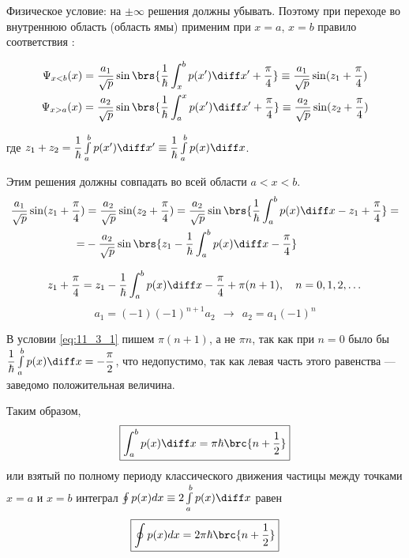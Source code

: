 Физическое условие: на $\pm \infty$ решения должны убывать. Поэтому при переходе во внутреннюю область (область ямы) применим при $x=a$, $x=b$ правило соответствия :

$$
\begin{gathered}
\Psi_{x<b}(x) = \frac{a_1}{\sqrt{p}} \sin\brs{\frac{1}{\hbar} \int_{x}^{b} p(x') \diff x' + \frac{\pi}{4} } \equiv \frac{a_1}{\sqrt{p}} \sin({z_1 + \frac{\pi}{4}}) \\
\Psi_{x>a}(x) = \frac{a_2}{\sqrt{p}} \sin\brs{\frac{1}{\hbar} \int_{a}^{x} p(x') \diff x' + \frac{\pi}{4} } \equiv \frac{a_2}{\sqrt{p}} \sin({z_2 + \frac{\pi}{4}})
\end{gathered}
$$

где $z_1+z_2 = \dfrac{1}{\hbar} \int \limits_{a}^{b} p(x') \diff x' \equiv \dfrac{1}{\hbar} \int \limits_{a}^{b} p(x) \diff x$.

Этим решения должны совпадать во всей области $a < x < b$.
$$
\begin{aligned}
\frac{a_1}{\sqrt{p}} \sin({z_1+\frac{\pi}{4}}) &= \frac{a_2}{\sqrt{p}} \sin({z_2+\frac{\pi}{4}}) = \frac{a_2}{\sqrt{p}} \sin\brs{\frac{1}{\hbar} \int_{a}^{b} p(x) \diff x - z_1 + \frac{\pi}{4}} = \\
=& -\frac{a_2}{\sqrt{p}} \sin\brs{z_1 - \frac{1}{\hbar} \int_{a}^{b} p(x) \diff x - \frac{\pi}{4} }
\end{aligned}
$$

\begin{equation}
\label{eq:11_3_1}
z_1 + \frac{\pi}{4} = z_1 - \frac{1}{\hbar} \int_{a}^{b} p(x) \diff x - \frac{\pi}{4} + \pi(n+1),~~~n = 0, 1, 2, \dots \\
\end{equation}
\begin{equation}
\label{eq:11_3_2}
a_1 = (-1)(-1)^{n+1}a_2  ~~\rightarrow~~ a_2 = a_1 (-1)^n
\end{equation}

В условии \eqref{eq:11_3_1} пишем $\pi (n+1)$, а не $\pi n$, так как при $n=0$ было бы $\dfrac{1}{\hbar}\int \limits_{a}^{b} p(x) \diff x = -\dfrac{\pi}{2}$, что недопустимо, так как левая часть этого равенства --- заведомо положительная величина.

Таким образом, 
\begin{equation}
\label{eq:11_3_3}
\boxed{\int_{a}^{b} p(x) \diff x = \pi\hbar\brc{n+\frac{1}{2}}}
\end{equation}
или взятый по полному периоду классического движения частицы между точками $x=a$ и $x=b$ интеграл $\oint p(x)dx \equiv 2 \int \limits_{a}^{b} p(x) \diff x$ равен
\begin{equation}
\label{eq:11_3_4}
\boxed{\oint p(x)dx = 2\pi\hbar\brc{n+\frac{1}{2}}}
\end{equation}

